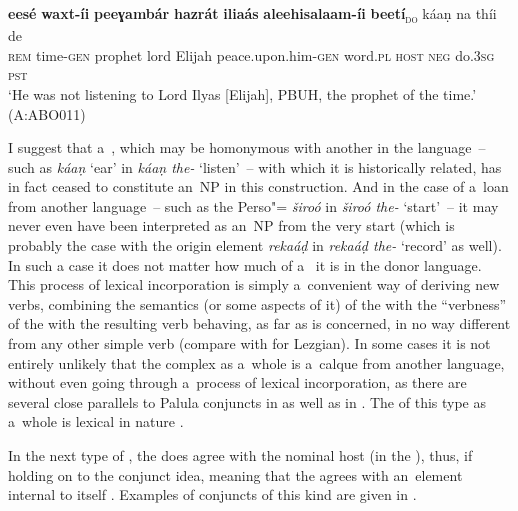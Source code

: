 \ea
\label{ex:12-76}
\gll {\ob}\textbf{eesé} \textbf{waxt-íi} \textbf{peeɣambár} \textbf{hazrát} \textbf{iliaás} \textbf{aleehisalaam-íi} \textbf{ beetí}{\cb}\textsubscript{\textsc{\upshape do}} káaṇ na thíi de\\
\textsc{rem} time-\textsc{gen} prophet lord Elijah peace.upon.him-\textsc{gen} word.\textsc{pl} \textsc{host} \textsc{neg} do.\textsc{3sg} \textsc{pst}\\
\glt `He was not listening to Lord Ilyas [Elijah], PBUH, the prophet of the time.' (A:ABO011)
\z

I suggest that a~, which may be homonymous with another  in the language~-- such as \textit{káaṇ} `ear' in \textit{káaṇ the-} `listen'~-- with which it is historically related, has in fact ceased to constitute an~NP in this construction. And in the case of a~loan from another language~-- such as the Perso"=\iliArabic {} \textit{široó} in \textit{široó the-} `start'~-- it may never even have been interpreted as an~NP from the very start (which is probably the case with the \iliEnglish origin element \textit{rekaáḍ} in \textit{rekaáḍ the-} `record' as well). In such a case it does not matter how much of a~ it is in the donor language. This process of lexical incorporation \citep[203]{verma1993} is simply a~convenient way of deriving new verbs, combining the semantics (or some aspects of it) of the  with the ``verbness'' of the  with the resulting verb behaving, as far as  is concerned, in no way different from any other simple  verb (compare with \citealt[286]{haspelmath1993} for Lezgian). In some cases it is not entirely unlikely that the complex as a~whole is a~calque from another language, without even going through a~process of lexical incorporation, as there are several close parallels to Palula conjuncts in \iliUrdu as well as in \iliPashto. The  of this type as a~whole is lexical in nature \citep[199]{verma1993}.



 In the next type of , the  does agree with the nominal host (in the ), thus, if holding on to the conjunct idea, meaning that the  agrees with an~element internal to itself \citep[168]{mohanan1993}. Examples of conjuncts of this kind are given in .


